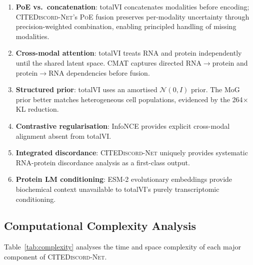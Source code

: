 \documentclass[11pt,a4paper]{article}
\newcommand{\cmat}{\textsc{CMAT}}
\newcommand{\poe}{\textsc{PoE}}
\newcommand{\citenet}{\textsc{CITEDiscord-Net}}
\begin{document}
\begin{enumerate}[leftmargin=*]
  \item \textbf{PoE vs.\ concatenation}: totalVI concatenates modalities before encoding; \citenet{}'s \poe{} fusion preserves per-modality uncertainty through precision-weighted combination, enabling principled handling of missing modalities.
  \item \textbf{Cross-modal attention}: totalVI treats RNA and protein independently until the shared latent space. \cmat{} captures directed RNA$\to$protein and protein$\to$RNA dependencies before fusion.
  \item \textbf{Structured prior}: totalVI uses an amortised $\mathcal{N}(0,I)$ prior. The MoG prior better matches heterogeneous cell populations, evidenced by the 264$\times$ KL reduction.
  \item \textbf{Contrastive regularisation}: InfoNCE provides explicit cross-modal alignment absent from totalVI.
  \item \textbf{Integrated discordance}: \citenet{} uniquely provides systematic RNA-protein discordance analysis as a first-class output.
  \item \textbf{Protein LM conditioning}: ESM-2 evolutionary embeddings provide biochemical context unavailable to totalVI's purely transcriptomic conditioning.
\end{enumerate}

\subsection{Computational Complexity Analysis}

Table~\ref{tab:complexity} analyses the time and space complexity of each major component of \citenet{}.
\end{document}
